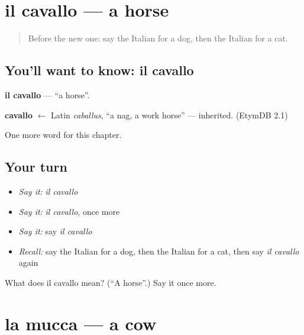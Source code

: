 \section[il cavallo]{il cavallo — a horse}

\label{lesson:IT-C68-cavallo}



\begin{quote}
Before the new one: say the Italian for a dog, then the Italian for a cat.
\end{quote}

\subsection*{You'll want to know: il cavallo}
\textbf{il cavallo} — \textquotedblleft{}a horse\textquotedblright{}.

\begin{cousinweb}
\textbf{cavallo} $\leftarrow$ Latin \emph{caballus}, \textquotedblleft{}a nag, a work horse\textquotedblright{} — inherited. (EtymDB 2.1)
\end{cousinweb}

\begin{grammarlens}[title={What you've built}]
One more word for this chapter.
\end{grammarlens}

\subsection*{Your turn}
\begin{itemize}
\raggedright
  \item \emph{Say it:} \emph{il cavallo}
  \item \emph{Say it:} \emph{il cavallo}, once more
  \item \emph{Say it:} say \emph{il cavallo}
  \item \emph{Recall:} say the Italian for a dog, then the Italian for a cat, then say \emph{il cavallo} again
\end{itemize}

\begin{tcolorbox}[breakable,colback=teal!4,colframe=teal!35!black,title={Before you move on}]
What does il cavallo mean? (\textquotedblleft{}A horse\textquotedblright{}.) Say it once more.
\end{tcolorbox}
\section[la mucca]{la mucca — a cow}

